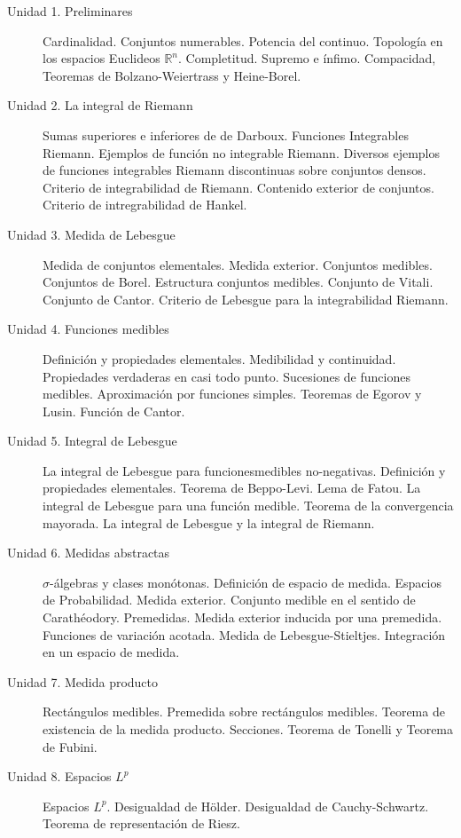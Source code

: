 \documentclass[a4paper, 12pt]{article}
\begin{document}
\begin{description}


\item[Unidad 1. Preliminares] Cardinalidad. Conjuntos numerables. Potencia del continuo. Topología en los espacios Euclideos $\mathbb{R}^n$. Completitud. Supremo e ínfimo. Compacidad, Teoremas de Bolzano-Weiertrass y Heine-Borel. 


\item[Unidad 2. La integral de Riemann] Sumas superiores e inferiores de de Darboux. Funciones Integrables Riemann. Ejemplos de función no integrable Riemann. Diversos ejemplos de funciones integrables Riemann discontinuas sobre conjuntos densos.  Criterio de integrabilidad de Riemann. Contenido exterior de conjuntos. Criterio de intregrabilidad de Hankel. 


\item[Unidad 3. Medida de Lebesgue] Medida de conjuntos elementales. Medida exterior. Conjuntos medibles. Conjuntos  de Borel. Estructura conjuntos medibles. Conjunto  de Vitali.  Conjunto de Cantor. Criterio de Lebesgue para la integrabilidad Riemann.

\item[Unidad 4. Funciones medibles] Definición y propiedades elementales. Medibilidad y continuidad. Propiedades verdaderas en casi todo punto. Sucesiones de funciones medibles. Aproximación por funciones simples. Teoremas de Egorov y Lusin. Función de Cantor.

\item[Unidad 5. Integral de Lebesgue] La integral de Lebesgue para funcionesmedibles  no-negativas. Definición y propiedades elementales. Teorema de Beppo-Levi. Lema de Fatou. La integral de Lebesgue para una función medible.  Teorema de la convergencia mayorada.  La integral de Lebesgue y la integral de Riemann.

\item[Unidad 6. Medidas abstractas] $\sigma$-álgebras y clases monótonas. Definición de espacio de medida. Espacios de  Probabilidad. Medida exterior. Conjunto medible en el sentido de Carathéodory.   Premedidas. Medida exterior inducida por una premedida. Funciones de variación acotada. Medida de Lebesgue-Stieltjes. Integración en un espacio de medida. 

\item[Unidad 7. Medida producto] Rectángulos medibles. Premedida sobre rectángulos medibles. Teorema de existencia de la medida producto. Secciones. Teorema de Tonelli y Teorema de Fubini.

\item[Unidad 8. Espacios $L^p$] Espacios $L^p$. Desigualdad de H\"older. Desigualdad de Cauchy-Schwartz. Teorema de representación de Riesz. 


\end{description}
\end{document}
